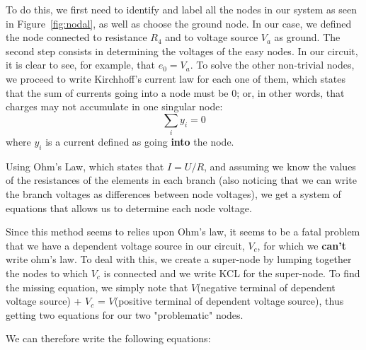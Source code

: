 To do this, we first need to identify and label all the nodes in our system as seen in Figure~\ref{fig:nodal},
 as well as choose the ground node. In our case, we defined the node connected to 
 resistance $R_4$ and to voltage source $V_a$ as ground. The second step consists in determining
  the voltages of the easy nodes. In our circuit, it is clear to see, for example, that $e_0 = V_a$.
   To solve the other non-trivial nodes, we proceed to write Kirchhoff's current law for each one of them,
    which states that the sum of currents going into a node must be 0;
     or, in other words, that charges may not accumulate in one singular node:
\begin{equation*}
    \sum_{i} y_i = 0
\end{equation*}
where $y_i$ is a current defined as going \textbf{into} the node.\par
Using Ohm's Law, which states that $I = U/R$, and assuming we know the values of the resistances
 of the elements in each branch (also noticing that we can write the branch
  voltages as differences between node voltages), we get a system of equations that
   allows us to determine each node voltage.
\par
Since this method seems to relies upon Ohm's law, it seems to be a fatal problem that we have a dependent voltage source in our circuit,
$V_c$, for which we \textbf{can't} write ohm's law. To deal with this,
we create a super-node by lumping together the nodes to which $V_c$ is connected and we write KCL
for the super-node. To find the missing equation, we simply note that
$V$(negative terminal of dependent voltage source) + $V_c$ = $V$(positive terminal of dependent voltage source),
thus getting two equations for our two "problematic" nodes.

We can therefore write the following equations:

